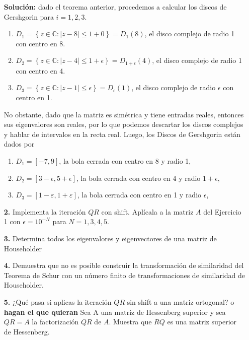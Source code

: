 \documentclass[letterpaper]{article}
\newcommand{\C}{\mathbb{C}}
\newcommand{\1}{\mathds{1}}
\theoremstyle{definition}
\theoremstyle{definition}
\theoremstyle{definition}
\theoremstyle{definition}
\theoremstyle{definition}
\begin{document}
\begin{enumerate}
    \textbf{Solución:} dado el teorema anterior, procedemos a calcular los discos de Gershgorin para $i=1,2,3$.
    \begin{enumerate}
        \item $D_{1}=\left\{z\in \C : |z-8|\leq 1+0\right\}=D_{1}(8)$, el disco complejo de radio 1 con 
        centro en 8.
        \item $D_{2}=\left\{z\in\C : |z-4|\leq 1+\epsilon\right\}=D_{1+\epsilon}(4)$, el disco complejo de 
        radio 1 con centro en 4.
        \item $D_{3}=\left\{z\in \C : |z-1|\leq \epsilon\right\}=D_{\epsilon}(1)$, el disco complejo de radio
        $\epsilon$ con centro en 1.
    \end{enumerate}
    No obstante, dado que la matriz es simétrica y tiene entradas reales, entonces sus eigenvalores son reales, por lo que
    podemos descartar los discos complejos y hablar de intervalos en la recta real. Luego, los Discos de Gershgorin están dados por 
    \begin{enumerate}
        \item $D_{1}=[-7,9]$, la bola cerrada con centro en 8 y radio 1,
        \item $D_{2}=[3-\epsilon,5+\epsilon]$, la bola cerrada con centro en 4 y radio $1+\epsilon$,
        \item $D_{3}=[1-\varepsilon,1+\varepsilon]$, la bola cerrada con centro en 1 y radio $\epsilon$,
    \end{enumerate}
    \item[\textbf{2.}] Implementa la iteración $QR$ con shift. Aplícala a la matriz $A$ del Ejercicio 1 con 
    $\epsilon=10^{-N}$ para $N=1,3,4,5$.
    \item[\textbf{3.}]Determina todos los eigenvalores y eigenvectores de una matriz de Householder
    \item[\textbf{4.}]Demuestra que no es posible construir la transformación de similaridad del Teorema
    de Schur con un número finito de transformaciones de similaridad de Householder.
    \item[\textbf{5.}]¿Qué pasa si aplicas la iteración $QR$ sin shift a una matriz ortogonal?
    o \textbf{hagan el que quieran} Sea A una matriz de Hessenberg superior y sea $QR=A$ la
    factorización $QR$ de $A$. Muestra que $RQ$ es una matriz superior de Hessenberg.
\end{enumerate}
\end{document}

